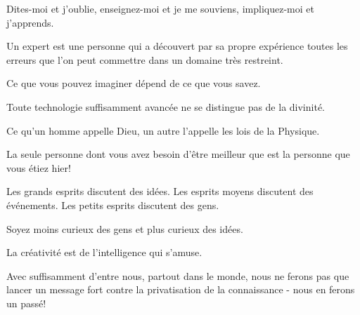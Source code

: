 \documentclass[12pt,a4paper,twoside,openright]{report}
\theoremstyle{definition}
\theoremstyle{itexmp}
\numberwithin{equation}{section}
\begin{document}
 	 \begin{fquote}Dites-moi et j'oublie, enseignez-moi et je me souviens, impliquez-moi et j'apprends.
 	\end{fquote}
 

 	 \begin{fquote}Un expert est une personne qui a découvert par sa propre expérience toutes les erreurs que l'on peut commettre dans un domaine très restreint.
 	\end{fquote}
 	
 	 \begin{fquote}Ce que vous pouvez imaginer dépend de ce que vous savez.
 	\end{fquote}
 	
 	\begin{fquote}Toute technologie suffisamment avancée ne se distingue pas de la divinité.
 	\end{fquote}
 	
 	\begin{fquote} Ce qu'un homme appelle Dieu, un autre l'appelle les lois de la Physique.
 	\end{fquote}
 	
 	\begin{fquote}[?]La seule personne dont vous avez besoin d'être meilleur que est la personne que vous étiez hier!
 	\end{fquote}
 	
 	\begin{fquote}Les grands esprits discutent des idées. Les esprits moyens discutent des événements. Les petits esprits discutent des gens.
 	\end{fquote}
 	
 	\begin{fquote}Soyez moins curieux des gens et plus curieux des idées.
 	\end{fquote}
 	
 	\begin{fquote}La créativité est de l'intelligence qui s'amuse.
 	\end{fquote}
 	
 	\begin{fquote}Avec suffisamment d'entre nous, partout dans le monde, nous ne ferons pas que lancer un message fort contre la privatisation de la connaissance - nous en ferons un passé!
 	\end{fquote}
 	
\end{document}
